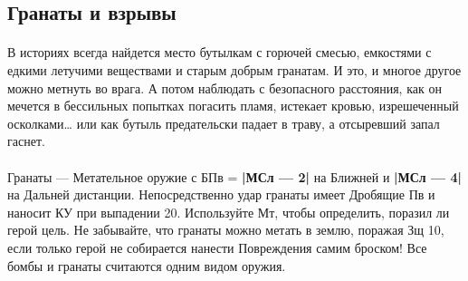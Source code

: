 \subsection{Гранаты и взрывы}
\paragraph{}
В историях всегда найдется место бутылкам с горючей смесью, емкостями с едкими летучими веществами и старым добрым гранатам. И это, и многое другое можно метнуть во врага. А потом наблюдать с безопасного расстояния, как он мечется в бессильных попытках погасить пламя, истекает кровью, изрешеченный осколками… или как бутыль предательски падает в траву, а отсыревший запал гаснет.
\paragraph{}
Гранаты — Метательное оружие с БПв = \textbf{|МСл — 2|} на Ближней и \textbf{|МСл — 4|} на Дальней дистанции. Непосредственно удар гранаты имеет Дробящие Пв и наносит КУ при выпадении 20. Используйте Мт, чтобы определить, поразил ли герой цель. Не забывайте, что гранаты можно метать в землю, поражая Зщ 10, если только герой не собирается нанести Повреждения самим броском!
\newline
Все бомбы и гранаты считаются одним видом оружия.
